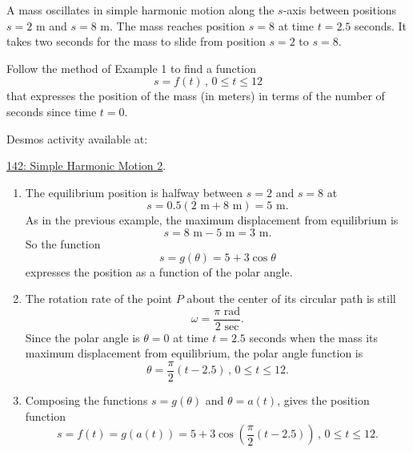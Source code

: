 \documentclass{ximera}
\begin{document}
\begin{example}  \label{Efdb56gthyn}
A mass oscillates in simple harmonic motion along the $s$-axis between positions $s=2$ m and $s=8$ m. The mass reaches position $s=8$ at time $t=2.5$ seconds. It takes two seconds for the mass to slide from position $s=2$ to $s=8$. 

Follow the method of Example 1 to find a function
\[
   s = f(t) \, , \, 0\leq t \leq 12
\]  
that expresses the position of the mass (in meters) in terms of the number of seconds since time $t=0$.

\begin{explanation}

Desmos activity available at:

\href{https://www.desmos.com/calculator/mpqtxfyzco}{142: Simple Harmonic Motion 2}.

 
\begin{onlineOnly}
    \begin{center}
\end{center}
\end{onlineOnly}

\begin{enumerate}

\item The equilibrium position is halfway between $s=2$ and $s=8$ at 
\[
  s = 0.5(2 \text{ m} + 8 \text{ m}) =  5 \text{ m}.
\]
As in the previous example, the maximum displacement from equilibrium is
\[
   s = 8\text{ m} - 5\text{ m} = 3 \text{ m}.
\] 
So the function 
\[
  s = g(\theta)  = 5+3\cos\theta 
\]
expresses the position as a function of the polar angle.

\item The rotation rate of the point $P$ about the center of its circular path is still
\[
   \omega = \frac{\pi \text{ rad}}{2 \text{ sec}} .
\]
Since the polar angle is $\theta = 0$ at time $t=2.5$ seconds when the mass its maximum displacement from equilibrium, the polar angle function is
\[
 \theta = \frac{\pi}{2}\left( t - 2.5 \right) \, , \, 0\leq t \leq 12.
\]

\item Composing the functions $s=g(\theta)$ and $\theta = a(t)$, gives the position function
\[
  s = f(t) = g(a(t)) = 5+3\cos\left( \frac{\pi}{2}(t-2.5) \right) \, , \, 0\leq t \leq 12.
\]
\end{enumerate}
\end{explanation}
\end{example}
\end{document}
